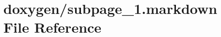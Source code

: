 \hypertarget{subpage__1_8markdown}{}\section{doxygen/subpage\+\_\+1.markdown File Reference}
\label{subpage__1_8markdown}
